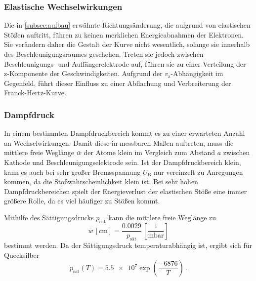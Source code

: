 \subsubsection{Elastische Wechselwirkungen}

Die in \autoref{subsec:aufbau} erwähnte Richtungsänderung, die aufgrund von elastischen Stößen auftritt,
führen zu keinen merklichen Energieabnahmen der Elektronen. 
Sie verändern daher die Gestalt der Kurve nicht wesentlich, solange sie innerhalb des Beschleunigungsraumes geschehen.
Treten sie jedoch zwischen Beschleunigungs- und Auffängerelektrode auf, führen sie zu einer Verteilung der z-Komponente der Geschwindigkeiten.
Aufgrund der $v_\text{z}$-Abhängigkeit im Gegenfeld, führt dieser Einfluss zu einer Abflachung und Verbreiterung der Franck-Hertz-Kurve.


\subsubsection{Dampfdruck}

In einem bestimmten Dampfdruckbereich kommt es zu einer erwarteten Anzahl an Wechselwirkungen.
Damit diese in messbaren Maßen auftreten, muss die mittlere freie Weglänge $\bar{w}$ der Atome klein im Vergleich
zum Abstand $a$ zwischen Kathode und Beschleunigungselektrode sein. 
Ist der Dampfdruckbereich klein, kann es auch bei sehr großer Bremsspannung $U_\text{B}$ nur vereinzelt zu Anregungen kommen, 
da die Stoßwahrscheinlichkeit klein ist. 
Bei sehr hohen Dampfdruckbereichen spielt der Energieverlust der elastischen Stöße eine immer größere Rolle, 
da es viel häufiger zu Stößen kommt.

Mithilfe des Sättigungsdrucks $p_\text{sät}$ kann die mittlere freie Weglänge zu
\begin{equation} \label{eq:druck1}
    \bar{w} \, [\unit{\centi\meter}] = \frac{0.0029}{p_\text{sät}} \, \left[ \frac{1}{\unit{\milli\bar}}\right]
\end{equation}
bestimmt werden.
Da der Sättigungsdruck temperaturabhängig ist, ergibt sich für Quecksilber 
\begin{equation}
    p_\text{sät}(T) = \num{5.5e7} \exp{\left( \frac{-6876}{T} \right)} \, .
\end{equation}